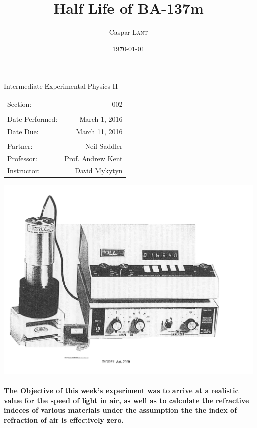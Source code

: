 \documentclass{amsart}
\title{Half Life of BA-137m}
\author{Caspar \textsc{Lant}} %
\date{\today} %
\begin{document}
\bigskip

\maketitle %
\begin{center}
    Intermediate Experimental Physics II\\
    \vspace{.7cm}
    \begin{tabular}{l r}
        Section: & 002\\
        \\
        Date Performed: & March 1, 2016 \\ %
        Date Due: & March 11, 2016\\
        \\
        Partner: & Neil Saddler\\ %
        Professor: & Prof. Andrew Kent\\
        Instructor: & David Mykytyn %
    \end{tabular}
    \vfill
    \includegraphics[width=\textwidth]{diagram.jpg}
    \vfill
\end{center}

\pagebreak
{}
\paragraph{\textbf{The Objective} of this week's experiment was to arrive at a realistic value for the speed of light in air, as well as to calculate the refractive indeces of various materials under the assumption the the index of refraction of air is effectively zero.}
\end{document}
